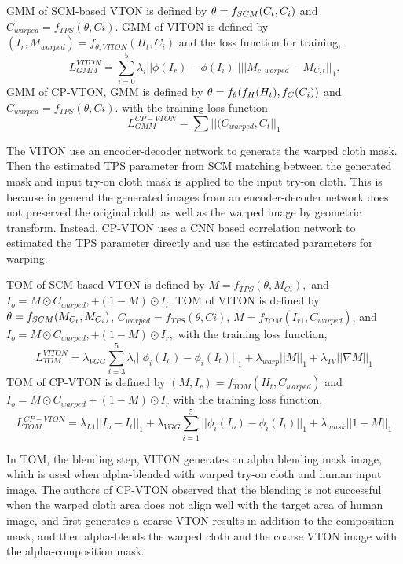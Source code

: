 GMM of SCM-based VTON is defined by  
$
   \bold{\theta} = f_{SCM} (C_t, C_i)
$
and
$
   C_{warped} = f_{TPS}(\theta, Ci)
$.    
GMM of VITON is defined by 
$
   (I_{r}, M_{warped}) = f_{\theta, VITON} (H_t, C_i) 
$
and the loss function for training, 
\[
   L_{GMM}^{VITON} =   \sum_{i=0}^{5} \lambda_i || \phi (I_r) - \phi (I_i)||  
   ||M_{c, warped} -  M_{C,t}||_1 .
\]
GMM of CP-VTON, GMM is defined by 
$  
   \bold{\theta} = f_{\theta} ( f_H (H_t), f_C(C_i) )
$
and
$
   C_{warped} = f_{TPS}(\theta, Ci).
$    
with the training loss function
\[
   L_{GMM}^{CP-VTON} =  \sum ||(C_{warped}, C_t||_1
\]

The VITON use an encoder-decoder network to generate the warped cloth mask. Then the estimated TPS parameter from SCM matching between the generated mask and input try-on cloth mask is applied to the input try-on cloth. This is because in general the generated images from an encoder-decoder network does not preserved the original cloth as well as the warped image by geometric transform. Instead, CP-VTON uses a CNN based correlation network to estimated the TPS parameter directly and use the estimated parameters for warping.   


TOM  of SCM-based VTON  is defined by 
$
   M = f_{TPS}(\theta, M_{Ci}),
$    
and 
$
   I_o = M \odot C_{warped}, + (1-M) \odot I_i 
$.
TOM of VITON is defined by 
$
   \bold{\theta} = f_{SCM} (M_{C_t}, M_{C_i})
$,
$
   C_{warped} = f_{TPS}(\theta, Ci)
$,    
$
 M = f_{TOM} ( I_{r1}, C_{warped} ) 
$, 
and 
$
   I_o = M \odot C_{warped}, + (1-M) \odot I_{r},
$
with the training loss function, 
\[
   L_{TOM}^{VITON} = \lambda_{VGG} \sum_{i=3}^{5} \lambda_i || \phi_i(I_o) - \phi_i(I_t)||_{1}  + 
             \lambda_{warp}  || M ||_{1}  + 
             \lambda_{TV} || \nabla M||_{1}      
\]
TOM of CP-VTON is defined by 
$
 (M, I_r) = f_{TOM} ( H_t, C_{warped} )  
$
and 
$
   I_o = M \odot C_{warped} + (1-M) \odot I_r
$
with the training loss function, 
\[
   L_{TOM}^{CP-VTON} = \lambda_{L1}  || I_o - I_t ||_1  + 
             \lambda_{VGG} \sum_{i=1}^{5} || \phi_i(I_o) - \phi_i(I_t)||_1  + 
             \lambda_{mask} || 1 - M ||_1      
\]


In TOM, the blending step, VITON generates an alpha blending mask image, which is used when alpha-blended with warped try-on cloth and human input image. The authors of CP-VTON observed that the blending is not successful when the warped  cloth area does not align well with the target area of human image, and first generates a coarse VTON results in addition to the composition mask, and then alpha-blends the warped cloth and the coarse VTON image with the alpha-composition mask.       


